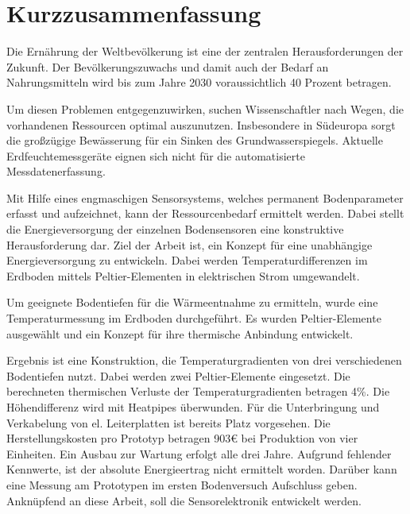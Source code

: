 \chapter*{Kurzzusammenfassung}

Die Ernährung der Weltbevölkerung ist eine der zentralen Herausforderungen der Zukunft. Der Bevölkerungszuwachs und damit auch der Bedarf an Nahrungsmitteln wird bis zum Jahre 2030 voraussichtlich 40 Prozent betragen. 

Um diesen Problemen entgegenzuwirken, suchen Wissenschaftler nach Wegen, die vorhandenen Ressourcen optimal auszunutzen. Insbesondere in Südeuropa sorgt die großzügige Bewässerung für ein Sinken des Grundwasserspiegels. %
Aktuelle Erdfeuchtemessgeräte eignen sich nicht für die automatisierte Messdatenerfassung. 


Mit Hilfe eines engmaschigen Sensorsystems, welches permanent Bodenparameter erfasst und aufzeichnet, kann der Ressourcenbedarf ermittelt werden. Dabei stellt die Energieversorgung der einzelnen Bodensensoren eine konstruktive Herausforderung dar.  
Ziel der Arbeit ist, ein Konzept für eine unabhängige Energieversorgung zu entwickeln. Dabei werden Temperaturdifferenzen im Erdboden mittels Peltier-Elementen in elektrischen Strom umgewandelt. 

Um geeignete Bodentiefen für die Wärmeentnahme zu ermitteln, wurde eine Temperaturmessung im Erdboden durchgeführt. Es wurden Peltier-Elemente ausgewählt und ein Konzept für ihre thermische Anbindung entwickelt. 

Ergebnis ist eine Konstruktion, die Temperaturgradienten von drei verschiedenen Bodentiefen nutzt. Dabei werden zwei Peltier-Elemente eingesetzt. Die berechneten thermischen Verluste der Temperaturgradienten betragen 4\%. Die Höhendifferenz wird mit Heatpipes überwunden. Für die Unterbringung und Verkabelung von el. Leiterplatten ist bereits Platz vorgesehen. Die Herstellungskosten pro Prototyp betragen \mbox{903\euro} bei Produktion von vier Einheiten. Ein Ausbau zur Wartung erfolgt alle drei Jahre. 
Aufgrund fehlender Kennwerte, ist der absolute Energieertrag nicht ermittelt worden. Darüber kann eine Messung am Prototypen im ersten Bodenversuch Aufschluss geben. Anknüpfend an diese Arbeit, soll die Sensorelektronik entwickelt werden. 